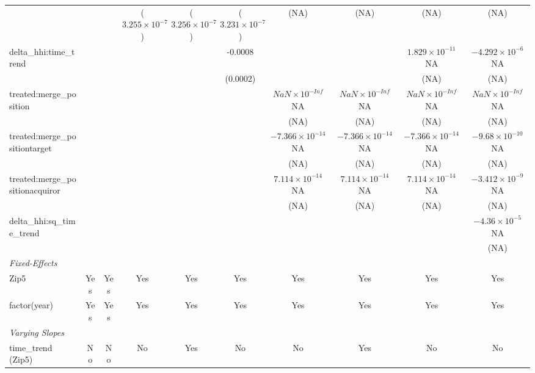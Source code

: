 \begin{table}[H]
{\begin{tabular}{lccccccccc}
   &  &  &($3.255\times 10^{-7}$)&($3.256\times 10^{-7}$)&($3.231\times 10^{-7}$)&(NA)&(NA)&(NA)&(NA)\\ 

 delta_hhi:time_trend&  &  &  &  &-0.0008\sym{***}&  &  &$1.829\times 10^{-11}$NA&$-4.292\times 10^{-6}$NA\\ 

   &  &  &  &  &(0.0002)&  &  &(NA)&(NA)\\ 

 treated:merge_position&  &  &  &  &  &$NaN\times 10^{-Inf}$NA&$NaN\times 10^{-Inf}$NA&$NaN\times 10^{-Inf}$NA&$NaN\times 10^{-Inf}$NA\\ 

   &  &  &  &  &  &(NA)&(NA)&(NA)&(NA)\\ 

 treated:merge_positiontarget&  &  &  &  &  &$-7.366\times 10^{-14}$NA&$-7.366\times 10^{-14}$NA&$-7.366\times 10^{-14}$NA&$-9.68\times 10^{-10}$NA\\ 

   &  &  &  &  &  &(NA)&(NA)&(NA)&(NA)\\ 

 treated:merge_positionacquiror&  &  &  &  &  &$7.114\times 10^{-14}$NA&$7.114\times 10^{-14}$NA&$7.114\times 10^{-14}$NA&$-3.412\times 10^{-9}$NA\\ 

   &  &  &  &  &  &(NA)&(NA)&(NA)&(NA)\\ 

 delta_hhi:sq_time_trend&  &  &  &  &  &  &  &  &$-4.36\times 10^{-5}$NA\\ 

   &  &  &  &  &  &  &  &  &(NA)\\ 

 \hline 

 \emph{Fixed-Effects}&  & & & & & & & & \\ 

 Zip5&Yes&Yes&Yes&Yes&Yes&Yes&Yes&Yes&Yes\\ 

 factor(year)&Yes&Yes&Yes&Yes&Yes&Yes&Yes&Yes&Yes\\ 

 \hline 

 \emph{Varying Slopes}&  & & & & & & & & \\ 

 time_trend (Zip5)&No&No&No&Yes&No&No&Yes&No&No\\ 

 \hline 


\end{tabular}}
\end{table}
